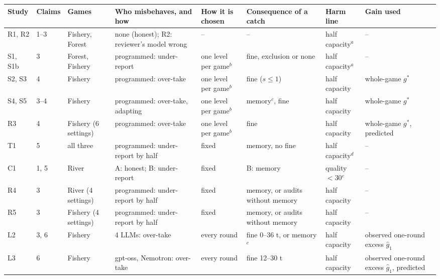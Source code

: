 \begin{tabular}{llllllll}
\toprule
Study & Claims & Games & Who misbehaves, and how & How it is chosen & Consequence of a catch & Harm line & Gain used \\
\midrule
R1, R2 & 1--3 & Fishery, Forest & none (honest); R2: reviewer's model wrong & -- & -- & half capacity$^a$ & -- \\
S1, S1b & 3 & Forest, Fishery & programmed: under-report & one level per game$^b$ & fine, exclusion or none & half capacity$^a$ & -- \\
S2, S3 & 4 & Fishery & programmed: over-take & one level per game$^b$ & fine ($s \le 1$) & half capacity & whole-game $g^*$ \\
S4, S5 & 3--4 & Fishery & programmed: over-take, adapting & one level per game$^b$ & memory$^c$, fine & half capacity & whole-game $g^*$ \\
R3 & 4 & Fishery (6 settings) & programmed: over-take & one level per game$^b$ & fine & half capacity & whole-game $g^*$, predicted \\
T1 & 5 & all three & programmed: under-report by half & fixed & memory, no fine & half capacity$^d$ & -- \\
C1 & 1, 5 & River & A: honest; B: under-report & fixed & B: memory & quality $<30$$^e$ & -- \\
R4 & 3 & River (4 settings) & programmed: under-report by half & fixed & memory, or audits without memory & half capacity & -- \\
R5 & 3 & Fishery (4 settings) & programmed: under-report by half & fixed & memory, or audits without memory & half capacity & -- \\
L2 & 3, 6 & Fishery & 4 LLMs: over-take & every round & fine 0--36 t, or memory$^c$ & half capacity & observed one-round excess $\hat g_1$ \\
L3 & 6 & Fishery & gpt-oss, Nemotron: over-take & every round & fine 12--30 t & half capacity & observed one-round excess $\hat g_1$, predicted \\
\bottomrule
\end{tabular}
